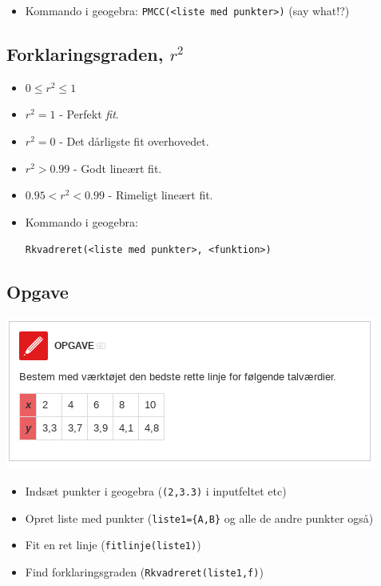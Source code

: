 \documentclass[11pt]{article}
\begin{document}
\begin{itemize}
\item Kommando i geogebra: \texttt{PMCC(<liste med punkter>)} (say what!?)
\end{itemize}

\subsection*{Forklaringsgraden, \(r^2\)}
\label{sec:orgd12597b}

\begin{itemize}
\item \(0 \leq r^2 \leq 1\)
\item \(r^2 = 1\) - Perfekt \emph{fit}.
\item \(r^2 = 0\) - Det dårligste fit overhovedet.
\item \(r^2 > 0.99\) - Godt lineært fit.
\item \(0.95 < r^2< 0.99\) - Rimeligt lineært fit.
\item Kommando i geogebra: 

\texttt{Rkvadreret(<liste med punkter>, <funktion>)}
\end{itemize}

\subsection*{Opgave}
\label{sec:org0e94b0e}

\begin{center}
\includegraphics[width=.9\linewidth]{img/screenshot_2019-09-05_11-08-46.png}
\end{center}
\begin{itemize}
\item Indsæt punkter i geogebra (\texttt{(2,3.3)} i inputfeltet etc)
\item Opret liste med punkter (\texttt{liste1=\{A,B\}} og alle de andre punkter også)
\item Fit en ret linje (\texttt{fitlinje(liste1)})
\item Find forklaringsgraden (\texttt{Rkvadreret(liste1,f)})
\end{itemize}
\end{document}
